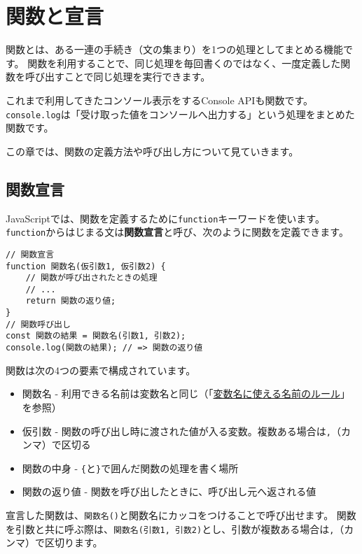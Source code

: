 \hypertarget{function-and-declaration}{%
\chapter{関数と宣言}\label{function-and-declaration}}

関数とは、ある一連の手続き（文の集まり）を1つの処理としてまとめる機能です。
関数を利用することで、同じ処理を毎回書くのではなく、一度定義した関数を呼び出すことで同じ処理を実行できます。

これまで利用してきたコンソール表示をするConsole APIも関数です。
\texttt{console.log}は「受け取った値をコンソールへ出力する」という処理をまとめた関数です。

この章では、関数の定義方法や呼び出し方について見ていきます。

\hypertarget{function-declaration}{%
\section{関数宣言}\label{function-declaration}}

JavaScriptでは、関数を定義するために\texttt{function}キーワードを使います。
\texttt{function}からはじまる文は\textbf{関数宣言}と呼び、次のように関数を定義できます。

\begin{lstlisting}
// 関数宣言
function 関数名(仮引数1, 仮引数2) {
    // 関数が呼び出されたときの処理
    // ...
    return 関数の返り値;
}
// 関数呼び出し
const 関数の結果 = 関数名(引数1, 引数2);
console.log(関数の結果); // => 関数の返り値
\end{lstlisting}

関数は次の4つの要素で構成されています。

\begin{itemize}
\item
  関数名 -
  利用できる名前は変数名と同じ（「\href{.../variables/README.md\#variable-name}{変数名に使える名前のルール}」を参照）
\item
  仮引数 -
  関数の呼び出し時に渡された値が入る変数。複数ある場合は\texttt{,}（カンマ）で区切る
\item
  関数の中身 -
  \texttt{\{}と\texttt{\}}で囲んだ関数の処理を書く場所
\item
  関数の返り値 - 関数を呼び出したときに、呼び出し元へ返される値
\end{itemize}

宣言した関数は、\texttt{関数名()}と関数名にカッコをつけることで呼び出せます。
関数を引数と共に呼ぶ際は、\texttt{関数名(引数1, 引数2)}とし、引数が複数ある場合は\texttt{,}（カンマ）で区切ります。

